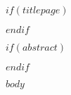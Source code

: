 \documentclass[
    a4paper,
    11pt,
    $for(classoption)$$classoption$,$endfor$
    onecolumn,
    titlepage,
    openany,
]{$if(documentclass)$$documentclass$$else$report$endif$}
\begin{document}

    $if(titlepage)$
    
    \cleardoublepage
    $endif$

    $if(abstract)$
    \begin{abstract}
        \thispagestyle{plain}
        
    \end{abstract}
    \cleardoublepage
    $endif$

    \sffamily
    \setcounter{tocdepth}{2}
    \tableofcontents
    \normalfont

    \cleardoublepage

    $body$

    
    

    \clearpage
    \begin{appendices}

    \end{appendices}
\end{document}
